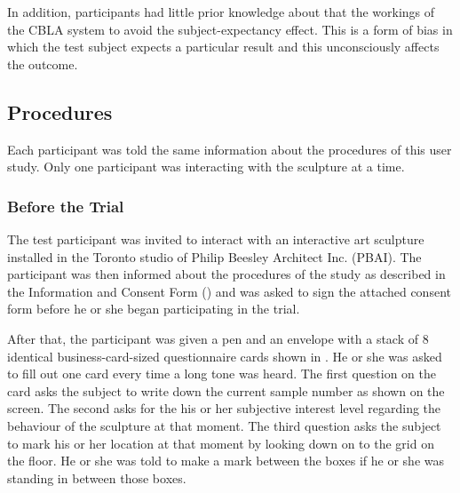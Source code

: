 In addition, participants had little prior knowledge about that the workings of the CBLA system to avoid the subject-expectancy effect. This is a form of bias in which the test subject expects a particular result and this unconsciously affects the outcome. 

\subsection{Procedures}\label{sec:user-study-procedure}

Each participant was told the same information about the procedures of this user study. Only one participant was interacting with the sculpture at a time. 

\subsubsection{Before the Trial}

The test participant was invited to interact with an interactive art sculpture installed in the Toronto studio of Philip Beesley Architect Inc. (PBAI). The participant was then informed about the procedures of the study as described in the Information and Consent Form () and was asked to sign the attached consent form before he or she began participating in the trial. 

After that, the participant was given a pen and an envelope with a stack of 8 identical business-card-sized questionnaire cards shown in . He or she was asked to fill out one card every time a long tone was heard. The first question on the card asks the subject to write down the current sample number as shown on the screen. The second asks for the his or her subjective interest level regarding the behaviour of the sculpture at that moment. The third question asks the subject to mark his or her location at that moment by looking down on to the grid on the floor. He or she was told to make a mark between the boxes if he or she was standing in between those boxes. 

